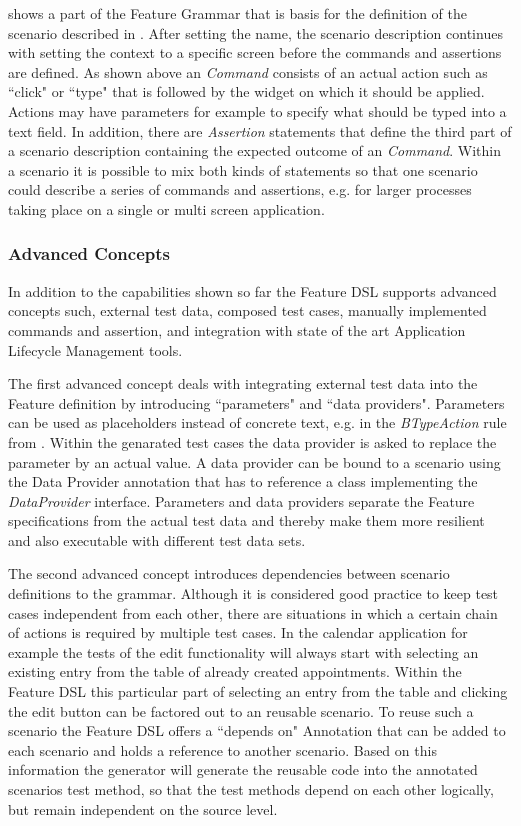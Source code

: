 \documentclass{sig-alternate-05-2015}
\begin{document}
 shows a part of the Feature Grammar that is basis for the definition of the scenario described in .
After setting the name, the scenario description continues with setting the context to a specific screen before the commands and assertions are defined.
As shown above an \textit{Command} consists of an actual action such as ``click" or ``type" that is followed by the widget on which it should be applied.
Actions may have parameters for example to specify what should be typed into a text field. 
In addition, there are \textit{Assertion} statements that define the third part of a scenario description containing the expected outcome of an \textit{Command}.
Within a scenario it is possible to mix both kinds of statements so that one scenario could describe a series of commands and assertions, e.g. for larger processes taking place on a single or multi screen application.   

\subsubsection{Advanced Concepts}
In addition to the capabilities shown so far the Feature DSL supports advanced concepts such, external test data, composed test cases, manually implemented commands and assertion, and integration with state of the art Application Lifecycle Management tools.
 
The first advanced concept deals with integrating external test data into the Feature definition by introducing ``parameters" and ``data providers".
Parameters can be used as placeholders instead of concrete text, e.g. in the \textit{BTypeAction} rule from .
Within the genarated test cases the data provider is asked to replace the parameter by an actual value.
A data provider can be bound to a scenario using the Data Provider annotation that has to reference a class implementing the \textit{DataProvider} interface.
Parameters and data providers separate the Feature specifications from the actual test data and thereby make them more resilient and also executable with different test data sets.

The second advanced concept introduces dependencies between scenario definitions to the grammar.
Although it is considered good practice to keep test cases independent from each other, there are situations in which a certain chain of actions is required by multiple test cases.
In the calendar application for example the tests of the edit functionality will always start with selecting an existing entry from the table of already created appointments.
Within the Feature DSL this particular part of selecting an entry from the table and clicking the edit button can be factored out to an reusable scenario.
To reuse such a scenario the Feature DSL offers a ``depends on" Annotation that can be added to each scenario and holds a reference to another scenario.
Based on this information the generator will generate the reusable code into the annotated scenarios test method, so that the test methods depend on each other logically, but remain independent on the source level.
\end{document}
